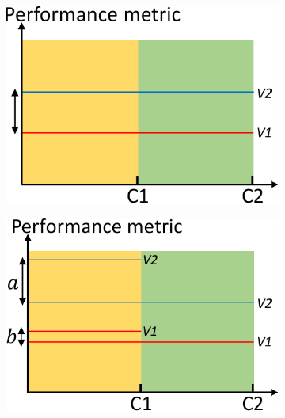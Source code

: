 \begin{figure}[t]
	\centering
        \begin{subfigure}{0.25\textwidth}
                \includegraphics[width=\linewidth]{Figures/background-a.pdf}
                \caption{}
                \label{fig:description-a}
        \end{subfigure}%
        \begin{subfigure}{0.25\textwidth}
                \includegraphics[width=\linewidth]{Figures/background-b.pdf}
                \caption{}
                \label{fig:description-b}
        \end{subfigure}%

\end{figure}
